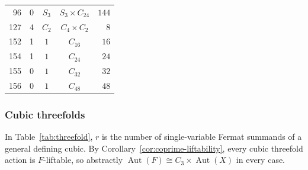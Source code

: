 \documentclass[12pt]{amsart}
\numberwithin{equation}{section}
\theoremstyle{plain}
\theoremstyle{definition}
\theoremstyle{remark}
\DeclareMathOperator{\Aut}{Aut}
\begin{document}
\begin{table}[htbp]
\begin{tabular}{@{}rcccr@{}}
96  & 0 & $S_3$                        & $S_3\times C_{24}$                              & $144$ \\
127 & 4 & $C_2$                        & $C_4\times C_2$                                 & $8$ \\
152 & 1 & $1$                          & $C_{16}$                                         & $16$ \\
154 & 1 & $1$                          & $C_{24}$                                         & $24$ \\
155 & 0 & $1$                          & $C_{32}$                                         & $32$ \\
156 & 0 & $1$                          & $C_{48}$                                         & $48$ \\
\bottomrule
\end{tabular}
\end{table}


\FloatBarrier

\subsubsection{Cubic threefolds}

In Table~\ref{tab:threefold}, $r$ is the number of single-variable Fermat
summands of a general defining cubic.
By Corollary~\ref{cor:coprime-liftability}, every cubic threefold action is
$F$-liftable, so abstractly
$\Aut(F)\cong C_3\times\Aut(X)$ in every case.
\end{document}
